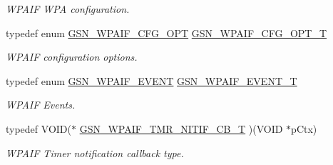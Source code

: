 \begin{DoxyCompactItemize}
\begin{DoxyCompactList}\small\item\em WPAIF WPA configuration. \end{DoxyCompactList}\item 
typedef enum \hyperlink{a00687_ga0f2a6686511220638235644511dee215}{GSN\_\-WPAIF\_\-CFG\_\-OPT} \hyperlink{a00687_ga40c2baeb843f878b19724138a045f065}{GSN\_\-WPAIF\_\-CFG\_\-OPT\_\-T}
\begin{DoxyCompactList}\small\item\em WPAIF configuration options. \end{DoxyCompactList}\item 
typedef enum \hyperlink{a00687_gab34b81549296cd8fc0728be0cfa16e87}{GSN\_\-WPAIF\_\-EVENT} \hyperlink{a00687_ga73929543fff4d9b512803f4cb0e94b47}{GSN\_\-WPAIF\_\-EVENT\_\-T}
\begin{DoxyCompactList}\small\item\em WPAIF Events. \end{DoxyCompactList}\item 
typedef VOID($\ast$ \hyperlink{a00687_ga84bfdf616b263689a81c060d1bdf224b}{GSN\_\-WPAIF\_\-TMR\_\-NITIF\_\-CB\_\-T} )(VOID $\ast$pCtx)
\begin{DoxyCompactList}\small\item\em WPAIF Timer notification callback type. \end{DoxyCompactList}\end{DoxyCompactItemize}

